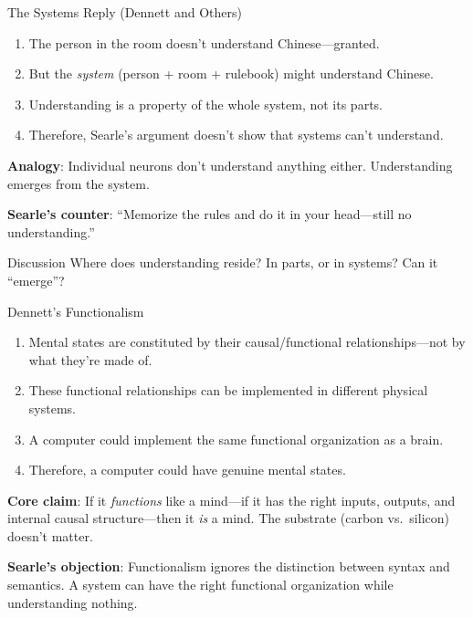 \documentclass[aspectratio=169,11pt]{beamer}
\begin{document}
\begin{frame}{The Systems Reply (Dennett and Others)}
\begin{probox}
\small
\begin{enumerate}
    \item The person in the room doesn't understand Chinese---granted.
    \item But the \emph{system} (person + room + rulebook) might understand Chinese.
    \item Understanding is a property of the whole system, not its parts.
    \item Therefore, Searle's argument doesn't show that systems can't understand.
\end{enumerate}
\end{probox}

\vspace{0.1em}
\textbf{Analogy}: Individual neurons don't understand anything either. Understanding emerges from the system.

\vspace{0.1em}
\textbf{Searle's counter}: ``Memorize the rules and do it in your head---still no understanding.''

\vspace{0.1em}
\begin{alertblock}{Discussion}
Where does understanding reside? In parts, or in systems? Can it ``emerge''?
\end{alertblock}
\end{frame}

\begin{frame}{Dennett's Functionalism}
\begin{probox}
\small
\begin{enumerate}
    \item Mental states are constituted by their causal/functional relationships---not by what they're made of.
    \item These functional relationships can be implemented in different physical systems.
    \item A computer could implement the same functional organization as a brain.
    \item Therefore, a computer could have genuine mental states.
\end{enumerate}
\end{probox}

\vspace{0.2em}
\textbf{Core claim}: If it \emph{functions} like a mind---if it has the right inputs, outputs, and internal causal structure---then it \emph{is} a mind. The substrate (carbon vs.\ silicon) doesn't matter.

\vspace{0.2em}
\textbf{Searle's objection}: Functionalism ignores the distinction between syntax and semantics. A system can have the right functional organization while understanding nothing.
\end{frame}
\end{document}
